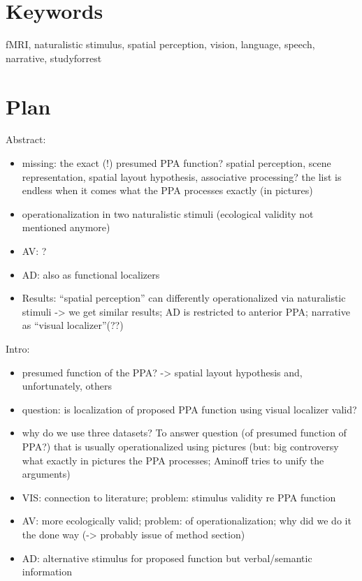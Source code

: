 \documentclass[english]{article}
\begin{document}

\section*{Keywords}
fMRI, naturalistic stimulus, spatial perception, vision, language, speech,
narrative, studyforrest

\pagebreak[4]

\section*{Plan}

\noindent Abstract:

\begin{itemize}
\item missing: the exact (!) presumed PPA function? spatial perception, scene
    representation, spatial layout hypothesis, associative processing? the list
    is endless when it comes what the PPA processes exactly (in pictures)
\item operationalization in two naturalistic stimuli (ecological validity not
    mentioned anymore)
\item AV: ?
\item AD: also as functional localizers
\item Results: ``spatial perception'' can differently operationalized via
    naturalistic stimuli -> we get similar results; AD is restricted to
    anterior PPA; narrative as ``visual localizer''(??)
\end{itemize}

\noindent Intro:

\begin{itemize}
\item presumed function of the PPA? -> spatial layout hypothesis and,
    unfortunately, others
\item question: is localization of proposed PPA function using visual localizer
    valid?
\item why do we use three datasets? To answer question (of presumed function of
    PPA?) that is usually operationalized using pictures (but: big controversy
what exactly in pictures the PPA processes; Aminoff tries to unify the
    arguments)
\item VIS: connection to literature; problem: stimulus validity re PPA function
\item AV: more ecologically valid; problem: of operationalization; why did we do
    it the done way (-> probably issue of method section)
\item AD: alternative stimulus for proposed function but verbal/semantic
    information
\end{itemize}
\end{document}
